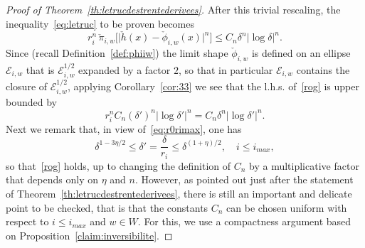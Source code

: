 \documentclass[10pt]{amsart}
\theoremstyle{definition}\newtheorem{defi}[theo]{Definition}\newtheorem{rema}[theo]{Remark}\newtheorem{exam}[theo]{Example}\newtheorem{exem}[theo]{Example}\newtheorem{nota}[theo]{Notation}
\newcommand{\clE}{\mathcal{E}}
\begin{document}
\begin{proof}[Proof of Theorem~\ref{th:letrucdestrentederivees}]
After this trivial rescaling, the inequality~\eqref{eq:letruc} to be proven becomes
\begin{equation}\label{rog}
r_i^n\,\check \pi_{i,w}\Big[\big|\check h(x)-\check\phi_{i,w}(x)\big|^n\Big]\le C_n \delta^n|\log \delta|^n.
\end{equation}
Since (recall Definition~\ref{def:phiiw}) the limit shape $\check \phi_{i,w}$ is defined on an ellipse $\clE_{i,w}$ that is $\clE^{1/2}_{i,w}$ expanded by a factor $2$, so that in particular $\clE_{i,w}$ contains the closure of $\clE^{1/2}_{i,w}$, applying Corollary~\ref{cor:33} we see that the l.h.s. of~\eqref{rog} is upper bounded by
\begin{equation}
r_i^n C_n (\delta')^n \left|\log \delta'\right|^n= C_n \delta^n \left|\log \delta'\right|^n.
\end{equation}
Next we remark that, in view of~\eqref{eq:r0rimax}, one has
\begin{equation}
\delta^{1-3\eta/2} \le \delta'=\frac{\delta}{r_i}\le \delta^{(1+\eta)/2}, \quad i\le i_{max},
\end{equation}
so that~\eqref{rog} holds, up to changing the definition of $C_n$ by a multiplicative factor that depends only on $\eta$ and $n$. However, as pointed out just after the statement of Theorem~\ref{th:letrucdestrentederivees}, there is still an important and delicate point to be checked, that is that the constants $C_n$ can be chosen uniform with respect to $i\le i_{max}$ and $w\in W$. For this, we use a compactness argument based on Proposition~\ref{claim:inversibilite}.


\end{proof}
\end{document}
